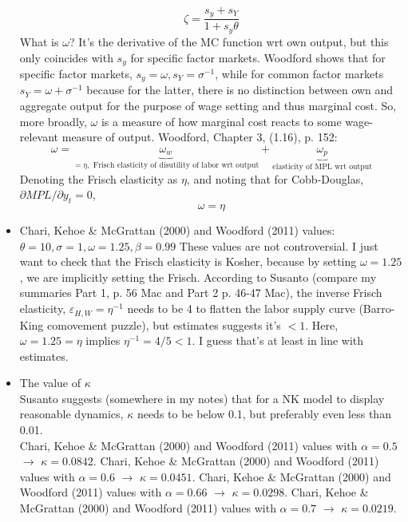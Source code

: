 \documentclass[11pt]{article}
\renewcommand{\[}{\begin{equation}}
\renewcommand{\]}{\end{equation}}
\begin{document}
\begin{itemize}
\begin{equation}
\zeta =  \frac{s_y + s_Y}{1+ s_y \theta}
\end{equation}
What is $\omega$? It's the derivative of the MC function wrt own output, but this only coincides with $s_y$ for specific factor markets. Woodford shows that for specific factor markets, $s_y = \omega, s_Y = \sigma^{-1}$, while for common factor markets $s_Y = \omega + \sigma^{-1}$ because for the latter, there is no distinction between own and aggregate output for the purpose of wage setting and thus marginal cost. So, more broadly, $\omega$ is a measure of how marginal cost reacts to some wage-relevant measure of output. Woodford, Chapter 3, (1.16), p. 152:
\begin{equation}
\omega = \underbrace{\omega_w}_{=\eta, \text{ Frisch elasticity of disutility of labor wrt output}} + \underbrace{\omega_p}_{\text{elasticity of MPL wrt output}}
\end{equation}
Denoting the Frisch elasticity as $\eta$, and noting that for Cobb-Douglas, $\partial MPL / \partial y_t = 0$, 
\begin{equation}
\omega = \eta
\end{equation}		
\item Chari, Kehoe \& McGrattan (2000) and Woodford (2011) values: $\theta =10, \sigma =1, \omega = 1.25, \beta = 0.99$
These values are not controversial. I just want to check that the Frisch elasticity is Kosher, because by setting $\omega = 1.25$, we are implicitly setting the Frisch. 
According to Susanto (compare my summaries Part 1, p. 56 Mac and Part 2 p. 46-47 Mac), the inverse Frisch elasticity, $\varepsilon_{H,W}=\eta^{-1}$ needs to be 4 to flatten the labor supply curve (Barro-King comovement puzzle), but estimates suggests it's $<1$. Here, $\omega=1.25=\eta$ implies $\eta^{-1}=4/5 <1$. I guess that's at least in line with estimates. 
\item The value of $\kappa$ \\
Susanto suggests (somewhere in my notes) that for a NK model to display reasonable dynamics, $\kappa$ needs to be below 0.1, but preferably even less than 0.01. \\
Chari, Kehoe \& McGrattan (2000) and Woodford (2011) values with $\alpha = 0.5$ $\rightarrow$ $\kappa = 0.0842$. 
Chari, Kehoe \& McGrattan (2000) and Woodford (2011) values with $\alpha = 0.6$ $\rightarrow$ $\kappa = 0.0451$. 
Chari, Kehoe \& McGrattan (2000) and Woodford (2011) values with $\alpha = 0.66$ $\rightarrow$ $\kappa = 0.0298$. 
Chari, Kehoe \& McGrattan (2000) and Woodford (2011) values with $\alpha = 0.7$ $\rightarrow$ $\kappa = 0.0219$. 
\end{itemize}
\end{document}
